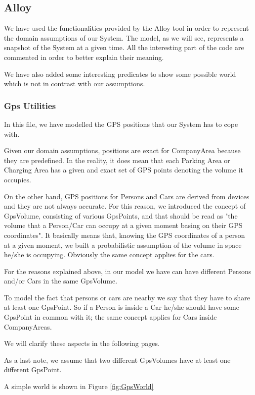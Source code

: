 \subsection{Alloy}
We have used the functionalities provided by the Alloy tool in order to represent the domain assumptions of our System. 
The model, as we will see, represents a snapshot of the System at a given time.
All the interesting part of the code are commented in order to better explain their meaning.

We have also added some interesting predicates to show some possible world which is not in contrast with our assumptions.

\subsubsection{Gps Utilities}
In this file, we have modelled the GPS positions that our System has to cope with.

Given our domain assumptions, positions are exact for CompanyArea because they are predefined. In the reality, it does mean that each Parking Area or Charging Area has a given and exact set of GPS points denoting the volume it occupies.

On the other hand, GPS positions for Persons and Cars are derived from devices and they are not always accurate.
For this reason, we introduced the concept of GpsVolume, consisting of various GpsPoints, and that should be read as "the volume that a Person/Car can occupy at a given moment basing on their GPS coordinates". It basically means that, knowing the GPS coordinates of a person at a given moment, we built a probabilistic assumption of the volume in space he/she is occupying. Obviously the same concept applies for the cars. 

For the reasons explained above, in our model we have can have different Persons and/or Cars in the same GpsVolume. 

To model the fact that persons or cars are nearby we say that they have to share at least one GpsPoint. So if a Person is inside a Car he/she should have some GpsPoint in common with it; the same concept applies for Cars inside CompanyAreas.

We will clarify these aspects in the following pages.

As a last note, we assume that two different GpsVolumes have at least one different GpsPoint.

A simple world is shown in Figure \ref{fig:GpsWorld}

